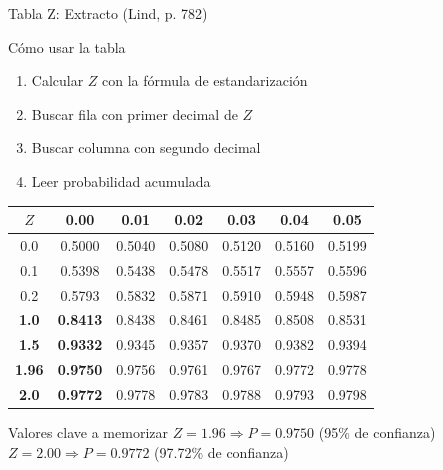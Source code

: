 \documentclass[10pt]{beamer}
\begin{document}
\begin{frame}{Tabla Z: Extracto (Lind, p. 782)}
\begin{block}{Cómo usar la tabla}
\begin{enumerate}
  \item Calcular $Z$ con la fórmula de estandarización
  \item Buscar fila con primer decimal de $Z$
  \item Buscar columna con segundo decimal
  \item Leer probabilidad acumulada
\end{enumerate}
\end{block}

\vspace{0.2cm}
\begin{center}
\footnotesize
\begin{tabular}{c|cccccc}
\toprule
\rowcolor{celeste}
$Z$ & 0.00 & 0.01 & 0.02 & 0.03 & 0.04 & 0.05 \\
\midrule
0.0 & 0.5000 & 0.5040 & 0.5080 & 0.5120 & 0.5160 & 0.5199 \\
0.1 & 0.5398 & 0.5438 & 0.5478 & 0.5517 & 0.5557 & 0.5596 \\
0.2 & 0.5793 & 0.5832 & 0.5871 & 0.5910 & 0.5948 & 0.5987 \\
\rowcolor{verdePastel!30}
\textbf{1.0} & \textbf{0.8413} & 0.8438 & 0.8461 & 0.8485 & 0.8508 & 0.8531 \\
\rowcolor{verdePastel!30}
\textbf{1.5} & \textbf{0.9332} & 0.9345 & 0.9357 & 0.9370 & 0.9382 & 0.9394 \\
\rowcolor{verdePastel!30}
\textbf{1.96} & \textbf{0.9750} & 0.9756 & 0.9761 & 0.9767 & 0.9772 & 0.9778 \\
\rowcolor{verdePastel!30}
\textbf{2.0} & \textbf{0.9772} & 0.9778 & 0.9783 & 0.9788 & 0.9793 & 0.9798 \\
\bottomrule
\end{tabular}
\end{center}

\vspace{0.2cm}
\begin{exampleblock}{Valores clave a memorizar}
$Z = 1.96 \Rightarrow P = 0.9750$ \quad (95\% de confianza)\\
$Z = 2.00 \Rightarrow P = 0.9772$ \quad (97.72\% de confianza)
\end{exampleblock}
\end{frame}
\end{document}
